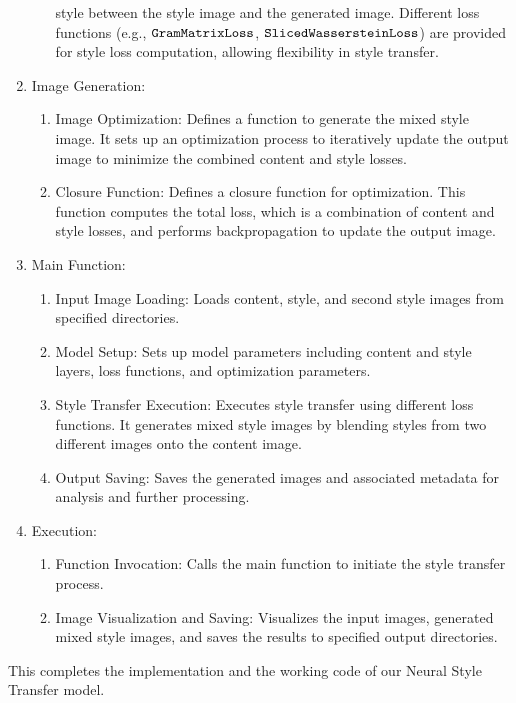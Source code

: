 \documentclass[12pt]{article}
\begin{document}
\begin{enumerate}
\begin{enumerate}
        style between the style image and the generated image. Different loss
        functions (e.g., $\verb|GramMatrixLoss|$,
        $\verb|SlicedWassersteinLoss|$) are provided for
        style loss computation, allowing flexibility in style transfer.
    \end{enumerate}
    \item Image Generation:
    \begin{enumerate}
        \item Image Optimization: Defines a function to generate the mixed style
        image. It sets up an optimization process to iteratively update the
        output image to minimize the combined content and style losses.
        \item Closure Function: Defines a closure function for optimization.
        This function computes the total loss, which is a combination of content
        and style losses, and performs backpropagation to update the output
        image.
    \end{enumerate}
    \item Main Function:
    \begin{enumerate}
        \item Input Image Loading: Loads content, style, and second style images
        from specified directories.
        \item Model Setup: Sets up model parameters including content and style
        layers, loss functions, and optimization parameters.
        \item Style Transfer Execution: Executes style transfer using different
        loss functions. It generates mixed style images by blending styles from
        two different images onto the content image.
        \item Output Saving: Saves the generated images and associated metadata
        for analysis and further processing.
    \end{enumerate}
    \item Execution:
    \begin{enumerate}
        \item Function Invocation: Calls the main function to initiate the style
        transfer process.
        \item Image Visualization and Saving: Visualizes the input images,
        generated mixed style images, and saves the results to specified output
        directories.
    \end{enumerate}
\end{enumerate}
This completes the implementation and the working code of our Neural Style
Transfer model.
\end{document}
